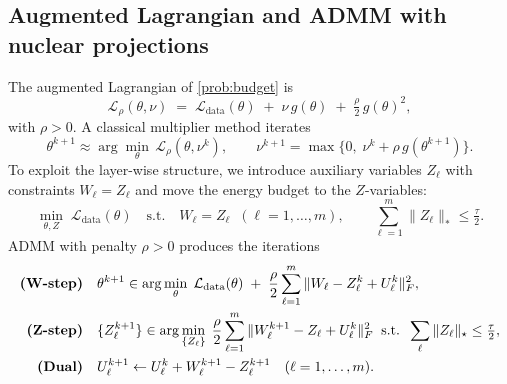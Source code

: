 \documentclass[a4paper,fleqn]{cas-sc}
\theoremstyle{remark}
\theoremstyle{definition}
\begin{document}
\subsection{Augmented Lagrangian and ADMM with nuclear projections}

The augmented Lagrangian of \eqref{prob:budget} is
\begin{equation}
  \mathcal{L}_\rho(\theta,\nu)\;=\;\mathcal{L}_{\text{data}}(\theta)\;+\;\nu\,g(\theta)\;+\;\tfrac{\rho}{2}\,g(\theta)^2,
\end{equation}
with $\rho>0$. A classical multiplier method iterates
\[
  \theta^{k+1}\approx \arg\min_\theta\,\mathcal{L}_\rho(\theta,\nu^k),
  \qquad
  \nu^{k+1}=\max\{0,\;\nu^k+\rho\,g(\theta^{k+1})\}.
\]
To exploit the layer-wise structure, we introduce auxiliary variables $Z_\ell$ with constraints $W_\ell=Z_\ell$ and move the energy budget to the $Z$-variables:
\[
\min_{\theta,Z}\;\mathcal{L}_{\text{data}}(\theta)\quad\text{s.t.}\quad
W_\ell=Z_\ell\;\;(\ell=1,\dots,m),\qquad \sum_{\ell=1}^m \|Z_\ell\|_*\le \tfrac{\tau}{2}.
\]
ADMM with penalty $\rho>0$ produces the iterations
\begin{align}
  \text{\bf (W-step)}\quad 
  &\theta^{k+1}\in\arg\min_\theta \;\mathcal{L}_{\text{data}}(\theta)\;+\;\frac{\rho}{2}\sum_{\ell=1}^m\|W_\ell-Z_\ell^{k}+U_\ell^{k}\|_F^2, \label{eq:admm-W}\\
  \text{\bf (Z-step)}\quad 
  &\{Z_\ell^{k+1}\}\in\arg\min_{\{Z_\ell\}} \;\frac{\rho}{2}\sum_{\ell=1}^m\|W_\ell^{k+1}-Z_\ell+U_\ell^{k}\|_F^2
     \;\;\text{s.t.}\;\; \sum_{\ell}\|Z_\ell\|_{\star}\le \tfrac{\tau}{2}, \label{eq:admm-Z}\\
  \text{\bf (Dual)}\quad 
  &U_\ell^{k+1} \leftarrow U_\ell^{k} + W_\ell^{k+1}-Z_\ell^{k+1}\quad(\ell=1,\dots,m).
\end{align}
\end{document}
